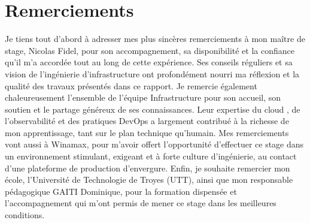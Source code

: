 \chapter*{Remerciements}

Je tiens tout d'abord à adresser mes plus sincères remerciements à mon maître de stage, Nicolas Fidel,
pour son accompagnement, sa disponibilité et la confiance qu'il m'a accordée tout au long de cette
expérience. Ses conseils réguliers et sa vision de l'ingénierie d'infrastructure ont profondément nourri
ma réflexion et la qualité des travaux présentés dans ce rapport.
Je remercie également chaleureusement l'ensemble de l'équipe Infrastructure pour son accueil, son
soutien et le partage généreux de ses connaissances. Leur expertise du cloud , de l'observabilité
et des pratiques DevOps a largement contribué à la richesse de mon apprentissage, tant sur le plan
technique qu'humain.
Mes remerciements vont aussi à Winamax, pour m'avoir offert l'opportunité d'effectuer ce stage dans
un environnement stimulant, exigeant et à forte culture d'ingénierie, au contact d'une plateforme de
production d'envergure.
Enfin, je souhaite remercier mon école, l'Université de Technologie de Troyes (UTT), ainsi que mon
responsable pédagogique GAITI Dominique, pour la formation dispensée et l'accompagnement qui m'ont
permis de mener ce stage dans les meilleures conditions.

